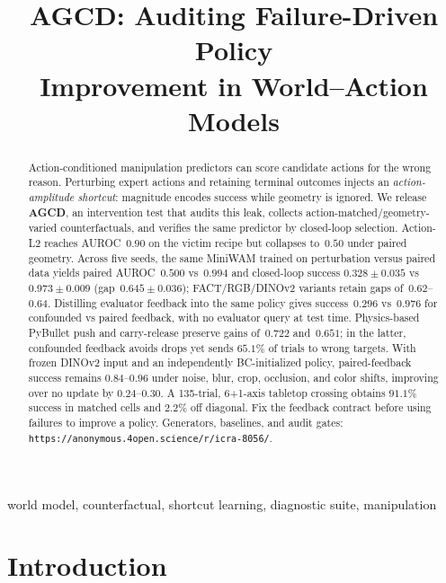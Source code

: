 \documentclass[conference]{IEEEtran}
\begin{document}
\title{AGCD: Auditing Failure-Driven Policy\\
Improvement in World--Action Models}

\author{
}

\maketitle


\begin{abstract}
Action-conditioned manipulation predictors can score candidate actions for the
wrong reason. Perturbing expert actions and retaining terminal outcomes injects
an \textit{action-amplitude shortcut}: magnitude encodes success while geometry
is ignored. We release \textbf{AGCD}, an intervention test that audits this
leak, collects action-matched/geometry-varied counterfactuals, and verifies the
same predictor by closed-loop selection. Action-L2 reaches AUROC~$0.90$ on the
victim recipe but collapses to~$0.50$ under paired geometry. Across five seeds,
the same MiniWAM trained on perturbation versus paired data yields paired
AUROC~$0.500$ vs~$0.994$ and closed-loop success
$0.328{\pm}0.035$ vs~$0.973{\pm}0.009$ (gap~$0.645{\pm}0.036$);
FACT/RGB/DINOv2 variants retain gaps of~$0.62$--$0.64$. Distilling
evaluator feedback into the same policy gives success~$0.296$ vs~$0.976$ for
confounded vs paired feedback, with no evaluator query at test time. Physics-based
PyBullet push and carry-release preserve gains of~$0.722$ and~$0.651$; in the
latter, confounded feedback avoids drops yet sends $65.1\%$ of trials to wrong
targets. With frozen DINOv2 input and an independently BC-initialized policy,
paired-feedback success remains $0.84$--$0.96$ under noise, blur, crop,
occlusion, and color shifts, improving over no update by $0.24$--$0.30$. A
135-trial, 6+1-axis tabletop crossing obtains $91.1\%$ success in matched cells
and $2.2\%$ off diagonal. Fix the feedback contract before using failures to
improve a policy.
Generators, baselines, and audit gates: \texttt{https://anonymous.4open.science/r/icra-8056/}.
\end{abstract}

\begin{IEEEkeywords}
world model, counterfactual, shortcut learning, diagnostic suite, manipulation
\end{IEEEkeywords}



\section{Introduction}
\label{sec:intro}
\end{document}
